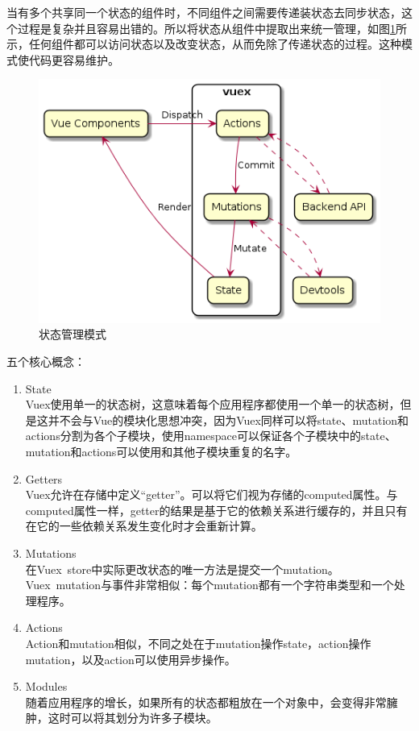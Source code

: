 当有多个共享同一个状态的组件时，不同组件之间需要传递装状态去同步状态，这个过程是复杂并且容易出错的。所以将状态从组件中提取出来统一管理，如图\ref{vuex-state-management-pattern}所示，任何组件都可以访问状态以及改变状态，从而免除了传递状态的过程。这种模式使代码更容易维护。

\begin{figure}[htbp]
  \centering
  \includegraphics[scale = 0.5]{out/uml/部署图/vuex-state-management-pattern/vuex-state-management-pattern.png}
  \caption{\song\wuhao 状态管理模式}
  \label{vuex-state-management-pattern}
\end{figure}

五个核心概念：

\begin{enumerate}
  \item State\\
        Vuex使用单一的状态树，这意味着每个应用程序都使用一个单一的状态树，但是这并不会与Vue的模块化思想冲突，因为Vuex同样可以将state、mutation和actions分割为各个子模块，使用namespace可以保证各个子模块中的state、mutation和actions可以使用和其他子模块重复的名字。
  \item Getters\\
        Vuex允许在存储中定义“getter”。可以将它们视为存储的computed属性。与computed属性一样，getter的结果是基于它的依赖关系进行缓存的，并且只有在它的一些依赖关系发生变化时才会重新计算。
  \item Mutations\\
        在Vuex~store中实际更改状态的唯一方法是提交一个mutation。Vuex~mutation与事件非常相似：每个mutation都有一个字符串类型和一个处理程序。
  \item Actions\\
        Action和mutation相似，不同之处在于mutation操作state，action操作mutation，以及action可以使用异步操作。
  \item Modules\\
        随着应用程序的增长，如果所有的状态都粗放在一个对象中，会变得非常臃肿，这时可以将其划分为许多子模块。
\end{enumerate}

